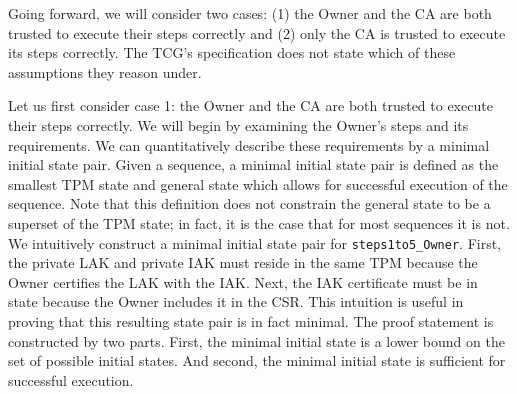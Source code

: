 Going forward, we will consider two cases: (1) the Owner and the CA are both trusted to execute their steps correctly and (2) only the CA is trusted to execute its steps correctly. The TCG's specification does not state which of these assumptions they reason under. 

Let us first consider case 1: the Owner and the CA are both trusted to execute their steps correctly. We will begin by examining the Owner's steps and its requirements. We can quantitatively describe these requirements by a minimal initial state pair. Given a sequence, a minimal initial state pair is defined as the smallest TPM state and general state which allows for successful execution of the sequence. Note that this definition does not constrain the general state to be a superset of the TPM state; in fact, it is the case that for most sequences it is not. We intuitively construct a minimal initial state pair for \verb|steps1to5_Owner|. First, the private LAK and private IAK must reside in the same TPM because the Owner certifies the LAK with the IAK. Next, the IAK certificate must be in state because the Owner includes it in the CSR. This intuition is useful in proving that this resulting state pair is in fact minimal. The proof statement is constructed by two parts. First, the minimal initial state is a lower bound on the set of possible initial states. And second, the minimal initial state is sufficient for successful execution.



